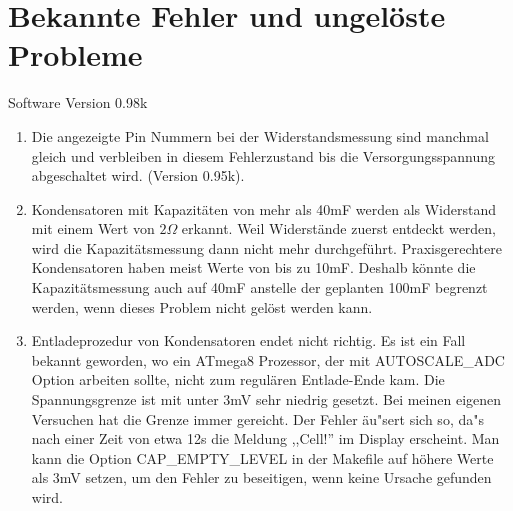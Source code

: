 
\chapter{Bekannte Fehler und ungel\"oste Probleme}
{\center Software Version 0.98k}

\begin{enumerate}
\item Die angezeigte Pin Nummern bei der Widerstandsmessung sind manchmal gleich und verbleiben in diesem
Fehlerzustand bis die Versorgungsspannung abgeschaltet wird.
(Version 0.95k).
\item Kondensatoren mit Kapazit\"aten von mehr als 40mF werden als Widerstand mit einem Wert von \(2\Omega\) erkannt.
Weil Widerst\"ande zuerst entdeckt werden, wird die Kapazit\"atsmessung dann nicht mehr durchgef\"uhrt.
Praxisgerechtere Kondensatoren haben meist Werte von bis zu 10mF.
Deshalb k\"onnte die Kapazit\"atsmessung auch auf 40mF anstelle der geplanten 100mF begrenzt werden, wenn dieses Problem nicht
gel\"ost werden kann.
\item Entladeprozedur von Kondensatoren endet nicht richtig. Es ist ein Fall bekannt geworden, wo ein ATmega8 Prozessor,
der mit AUTOSCALE\_ADC Option arbeiten sollte, nicht zum regul\"aren Entlade-Ende kam.
Die Spannungsgrenze ist mit unter 3mV sehr niedrig gesetzt. Bei meinen eigenen Versuchen hat die Grenze immer gereicht.
Der Fehler \"au"sert sich so, da"s nach einer Zeit von etwa 12s die Meldung ,,Cell!'' im Display erscheint.
Man kann die Option CAP\_EMPTY\_LEVEL in der Makefile auf h\"ohere Werte als 3mV setzen, um den Fehler zu beseitigen,
wenn keine Ursache gefunden wird.

\end{enumerate}
